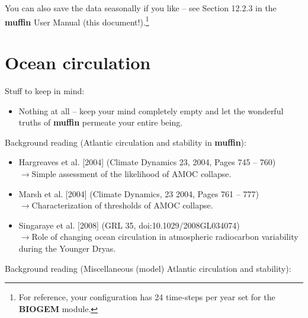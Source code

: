 \documentclass[11pt,fleqn]{book} %
\begin{document}
You can also save the data seasonally if you like – see Section 12.2.3 in the \textbf{muffin} User Manual (this document!).\footnote{For reference, your configuration has 24 time-steps per year set for the \textbf{BIOGEM} module.}


\cleardoublepage


\chapter{Ocean circulation}

\hfill \break

\noindent Stuff to keep in mind:

\begin{itemize}
\item Nothing at all – keep your mind completely empty and let the wonderful truths of \textbf{muffin} permeate your entire being.
\end{itemize}

\vspace{2mm}
\noindent Background reading (Atlantic circulation and stability in \textbf{muffin}):

\vspace{2mm}
\begin{itemize}
\item Hargreaves et al. [2004] (Climate Dynamics 23, 2004, Pages 745 – 760)
\\\(\rightarrow\)Simple assessment of the likelihood of AMOC collapse.
\item Marsh et al. [2004] (Climate Dynamics, 23 2004, Pages 761 – 777)
\\\(\rightarrow\)Characterization of thresholds of AMOC collapse.
\item Singaraye et al. [2008] (GRL 35, doi:10.1029/2008GL034074) 
\\\(\rightarrow\)Role of changing ocean circulation in atmospheric radiocarbon variability during the Younger Dryas.
\end{itemize}

\vspace{2mm}
\noindent Background reading (Miscellaneous (model) Atlantic circulation and stability):
\end{document}

